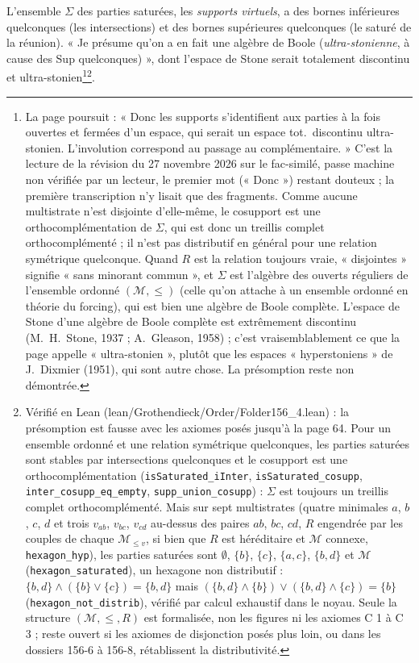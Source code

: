 \documentclass[11pt,a4paper]{article}
\begin{document}
L'ensemble $\Sigma$ des parties saturées, les \emph{supports virtuels}, a des
bornes inférieures quelconques (les intersections) et des bornes supérieures
quelconques (le saturé de la réunion). « Je présume qu'on a en fait une algèbre
de Boole (\emph{ultra-stonienne}, à cause des Sup quelconques) », dont l'espace
de Stone serait totalement discontinu et ultra-stonien\footnote{La page
poursuit : « Donc les supports s'identifient aux parties à la fois ouvertes et
fermées d'un espace, qui serait un espace tot.\ discontinu ultra-stonien.
L'involution correspond au passage au complémentaire. » C'est la lecture de la
révision du 27 novembre 2026 sur le fac-similé, passe machine non vérifiée par
un lecteur, le premier mot (« Donc ») restant douteux ; la première
transcription n'y lisait que des fragments. Comme aucune
multistrate n'est disjointe d'elle-même, le cosupport est une orthocomplémentation
de $\Sigma$, qui est donc un treillis complet orthocomplémenté ; il n'est pas
distributif en général pour une relation symétrique quelconque. Quand $R$ est
la relation toujours vraie, « disjointes » signifie « sans minorant commun »,
et $\Sigma$ est l'algèbre des ouverts réguliers de l'ensemble ordonné
$(\mathcal{M}, \leq)$ (celle qu'on attache à un ensemble ordonné en théorie
du forcing), qui est bien une algèbre de Boole complète. L'espace de Stone
d'une algèbre de Boole complète est extrêmement discontinu (M.~H.~Stone, 1937 ;
A.~Gleason, 1958) ; c'est vraisemblablement ce que la page appelle
« ultra-stonien », plutôt que les espaces « hyperstoniens » de J.~Dixmier
(1951), qui sont autre chose. La présomption reste non démontrée.}\footnote{Vérifié en Lean (lean/Grothendieck/Order/Folder156\_4.lean) : la
présomption est fausse avec les axiomes posés jusqu'à la page 64. Pour un
ensemble ordonné et une relation symétrique quelconques, les parties saturées
sont stables par intersections quelconques et le cosupport est une
orthocomplémentation (\texttt{isSaturated\_iInter},
\texttt{isSaturated\_cosupp}, \texttt{inter\_cosupp\_eq\_empty},
\texttt{supp\_union\_cosupp}) : $\Sigma$ est toujours un treillis complet
orthocomplémenté. Mais sur sept multistrates (quatre minimales $a$, $b$,
$c$, $d$ et trois $v_{ab}$, $v_{bc}$, $v_{cd}$ au-dessus des paires $ab$, $bc$,
$cd$, $R$ engendrée par les couples de chaque $\mathcal{M}_{\leq v}$, si bien que
$R$ est héréditaire et $\mathcal{M}$ connexe, \texttt{hexagon\_hyp}), les
parties saturées sont $\emptyset$, $\{b\}$, $\{c\}$, $\{a,c\}$, $\{b,d\}$ et
$\mathcal{M}$ (\texttt{hexagon\_saturated}), un hexagone non distributif :
$\{b,d\} \wedge (\{b\} \vee \{c\}) = \{b,d\}$ mais $(\{b,d\} \wedge \{b\}) \vee
(\{b,d\} \wedge \{c\}) = \{b\}$ (\texttt{hexagon\_not\_distrib}), vérifié par
calcul exhaustif dans le noyau. Seule la structure $(\mathcal{M}, \leq, R)$ est
formalisée, non les figures ni les axiomes C 1 à C 3 ; reste ouvert si les
axiomes de disjonction posés plus loin, ou dans les dossiers 156-6 à 156-8,
rétablissent la distributivité.}.
\end{document}
